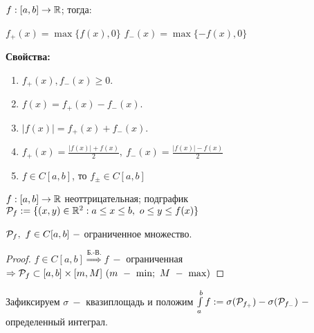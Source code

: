 \begin{definition}
    $f:[a,b]\rightarrow \mathbb{R}$; тогда:

    $f_+(x)=\max\{f(x),0\}$
    $f_-(x)=\max\{-f(x),0\}$
\end{definition}

\begin{statement}
    \textbf{Свойства:}

    \begin{enumerate}
        \item $f_+(x),f_-(x)\geq 0$.
        \item $f(x)=f_+(x)-f_-(x)$.
        \item $|f(x)|=f_+(x)+f_-(x)$.
        \item $f_+(x)=\frac{|f(x)|+f(x)}{2},\ f_-(x)=\frac{|f(x)|-f(x)}{2}$
        \item $f\in C[a,b]$, то $f_\pm \in C[a,b]$
    \end{enumerate}
\end{statement}

\begin{definition}
    $f:[a,b]\rightarrow \mathbb{R}$ неоттрицательная; подграфик $\mathcal{P}_f:=\{(x,y)\in \mathbb{R}^2:a\leq x\leq b,\ o\leq y\leq f(x)\}$
\end{definition}

\begin{remark}
    $\mathcal{P}_f,\ f\in C[a,b]\ -$ ограниченное множество.
\end{remark}

\begin{proof}
    $f\in C[a,b]\overset{\text{Б.-В.}}{\Rightarrow}f\ -$ ограниченная $\Rightarrow \mathcal{P}_f\subset [a, b]\times[m, M]\ (m\ -\ \min;\ M\ -\ \max)$
\end{proof}

\begin{definition}
    Зафиксируем $\sigma\ -$ квазиплощадь и положим $\int\limits_a^b f:=\sigma(\mathcal{P}_{f_+})-\sigma(\mathcal{P}_{f_-})\ -$ определенный интеграл.
\end{definition}

